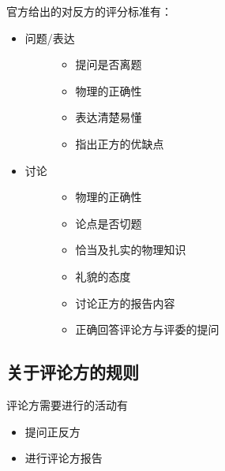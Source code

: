 \documentclass[a4paper,10pt,english]{sphinxmanual}
\begin{document}
官方给出的对反方的评分标准有：
\begin{itemize}
\item {} \begin{description}
\item[{问题/表达}] \leavevmode\begin{itemize}
\item {} 
提问是否离题

\item {} 
物理的正确性

\item {} 
表达清楚易懂

\item {} 
指出正方的优缺点

\end{itemize}

\end{description}

\item {} \begin{description}
\item[{讨论}] \leavevmode\begin{itemize}
\item {} 
物理的正确性

\item {} 
论点是否切题

\item {} 
恰当及扎实的物理知识

\item {} 
礼貌的态度

\item {} 
讨论正方的报告内容

\item {} 
正确回答评论方与评委的提问

\end{itemize}

\end{description}

\end{itemize}


\subsection{关于评论方的规则}
\label{\detokenize{7. Tournament:id5}}
评论方需要进行的活动有
\begin{itemize}
\item {} 
提问正反方

\item {} 
进行评论方报告

\end{itemize}
\end{document}

